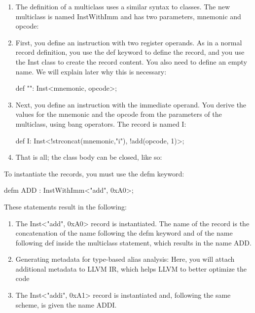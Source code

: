 \begin{enumerate}
\item
The definition of a multiclass uses a similar syntax to classes. The new multiclass is named InstWithImm and has two parameters, mnemonic and opcode:

\begin{shell}
multiclass InstWithImm<string mnemonic, int opcode> {
\end{shell}

\item
First, you define an instruction with two register operands. As in a normal record definition, you use the def keyword to define the record, and you use the Inst class to create the record content. You also need to define an empty name. We will explain later why this is necessary:

\begin{shell}
    def "": Inst<mnemonic, opcode>;
\end{shell}

\item
Next, you define an instruction with the immediate operand. You derive the values for the mnemonic and the opcode from the parameters of the multiclass, using bang operators. The record is named I:

\begin{shell}
    def I: Inst<!strconcat(mnemonic,"i"), !add(opcode, 1)>;
\end{shell}

\item
That is all; the class body can be closed, like so:

\begin{shell}
}
\end{shell}
\end{enumerate}

To instantiate the records, you must use the defm keyword:

\begin{shell}
defm ADD : InstWithImm<"add", 0xA0>;
\end{shell}

These statements result in the following:

\begin{enumerate}
\item
The Inst<"add", 0xA0> record is instantiated. The name of the record is the concatenation of the name following the defm keyword and of the name following def inside the multiclass statement, which results in the name ADD.

\item
Generating metadata for type-based alias analysis: Here, you will attach additional metadata to LLVM IR, which helps LLVM to better optimize the code

\item
The Inst<"addi", 0xA1> record is instantiated and, following the same scheme, is given the name ADDI.
\end{enumerate}

